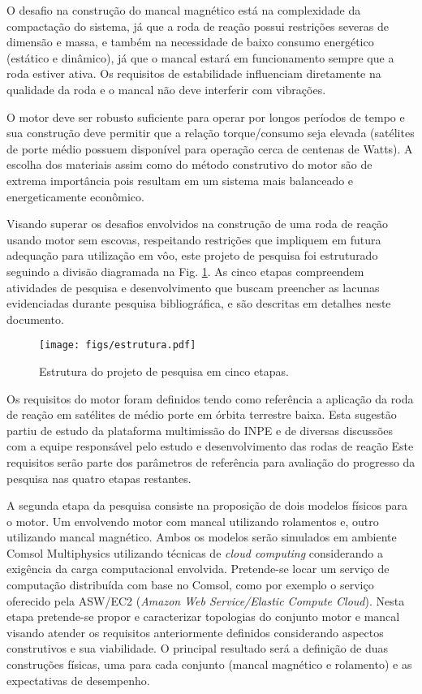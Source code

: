 O desafio na construção do mancal magnético está na complexidade da compactação do sistema, já que a roda de reação possui restrições severas de dimensão e massa, e também na necessidade de baixo consumo energético (estático e dinâmico), já que o mancal estará em funcionamento sempre que a roda estiver ativa. Os requisitos de estabilidade influenciam diretamente na qualidade da roda e o mancal não deve interferir com vibrações.

O motor deve ser robusto suficiente para operar por longos períodos de tempo e sua construção deve permitir que a relação torque/consumo seja elevada (satélites de porte médio possuem disponível para operação cerca de centenas de Watts). A escolha dos materiais assim como do método construtivo do motor são de extrema importância pois resultam em um sistema mais balanceado e energeticamente econômico. 

Visando superar os desafios envolvidos na construção de uma roda de reação usando motor sem escovas, respeitando restrições que impliquem em futura adequação para utilização em vôo, este projeto de pesquisa foi estruturado seguindo a divisão diagramada na Fig. \ref{fig:estrutura}. As cinco etapas compreendem atividades de pesquisa e desenvolvimento que buscam preencher as lacunas evidenciadas durante pesquisa bibliográfica, e são descritas em detalhes neste documento.

\begin{figure}[h!]  
	\centering
		\texttt{[image: figs/estrutura.pdf]}
	\caption{Estrutura do projeto de pesquisa em cinco etapas.}
	\label{fig:estrutura}
\end{figure}
	
Os requisitos do motor foram definidos tendo como referência a aplicação da roda de reação em satélites de médio porte em órbita terrestre baixa. Esta sugestão partiu de estudo da plataforma multimissão do INPE e de diversas discussões com a equipe responsável pelo estudo e desenvolvimento das rodas de reação Este requisitos serão parte dos parâmetros de referência para avaliação do progresso da pesquisa nas quatro etapas restantes.
	
A segunda etapa da pesquisa consiste na proposição de dois modelos físicos para o motor. Um envolvendo motor com mancal utilizando rolamentos e, outro utilizando mancal magnético. Ambos os modelos serão simulados em ambiente Comsol Multiphysics \cite{pilat2007automatic} utilizando técnicas de \textit{cloud computing} \cite{juethner2011dramatically} considerando a exigência da carga computacional envolvida. Pretende-se locar um serviço de computação distribuída com base no Comsol, como por exemplo o serviço oferecido pela ASW/EC2 (\textit{Amazon Web Service/Elastic Compute Cloud}). Nesta etapa pretende-se propor e caracterizar topologias do conjunto motor e mancal visando atender os requisitos anteriormente definidos considerando aspectos construtivos e sua viabilidade. O principal resultado será a definição de duas construções físicas, uma para cada conjunto (mancal magnético e rolamento) e as expectativas de desempenho.
	
